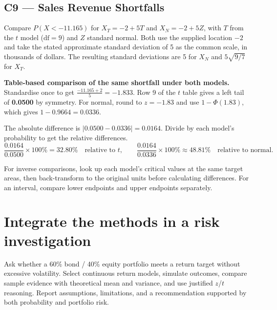 \subsection*{C9 --- Sales Revenue Shortfalls}

Compare \(P(X<-11.165)\) for \(X_T=-2+5T\) and \(X_N=-2+5Z\), with \(T\) from the \(t\) model (\(\mathrm{df}=9\)) and \(Z\) standard normal. Both use the supplied location \(-2\) and take the stated approximate standard deviation of 5 as the common scale, in thousands of dollars. The resulting standard deviations are 5 for \(X_N\) and \(5\sqrt{9/7}\) for \(X_T\).

\textbf{Table-based comparison of the same shortfall under both models.}
Standardise once to get \(\frac{-11.165+2}{5}=-1.833\). Row 9 of the \(t\) table gives a left tail of \textbf{0.0500} by symmetry. For normal, round to \(z=-1.83\) and use \(1-\Phi(1.83)\), which gives \(1-0.9664=\mathbf{0.0336}\).

The absolute difference is \(\lvert0.0500-0.0336\rvert=\mathbf{0.0164}\). Divide by each model's probability to get the relative differences.
\[
  \frac{0.0164}{0.0500}\times100\%=32.80\%\quad\text{relative to }t,
  \qquad
  \frac{0.0164}{0.0336}\times100\%\approx48.81\%\quad\text{relative to normal}.
\]

For inverse comparisons, look up each model's critical values at the same target areas, then back-transform to the original units before calculating differences. For an interval, compare lower endpoints and upper endpoints separately.

\clearpage
\section{Integrate the methods in a risk investigation}

Ask whether a 60\% bond / 40\% equity portfolio meets a return target without excessive volatility. Select continuous return models, simulate outcomes, compare sample evidence with theoretical mean and variance, and use justified \(z\)/\(t\) reasoning. Report assumptions, limitations, and a recommendation supported by both probability and portfolio risk.


